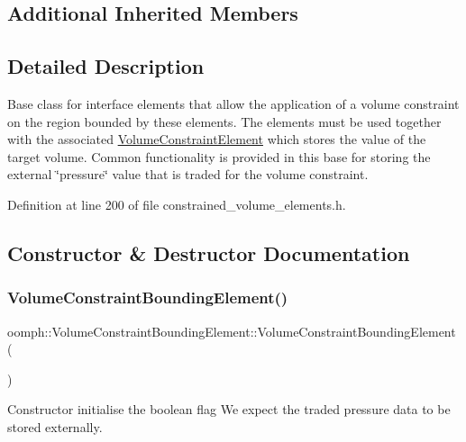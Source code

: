 \subsection*{Additional Inherited Members}


\subsection{Detailed Description}
Base class for interface elements that allow the application of a volume constraint on the region bounded by these elements. The elements must be used together with the associated \hyperlink{classoomph_1_1VolumeConstraintElement}{Volume\+Constraint\+Element} which stores the value of the target volume. Common functionality is provided in this base for storing the external \char`\"{}pressure\char`\"{} value that is traded for the volume constraint. 

Definition at line 200 of file constrained\+\_\+volume\+\_\+elements.\+h.



\subsection{Constructor \& Destructor Documentation}
\mbox{\label{classoomph_1_1VolumeConstraintBoundingElement_a423139995a5543fda59d36cf230edb44}} 
\subsubsection{\texorpdfstring{Volume\+Constraint\+Bounding\+Element()}{VolumeConstraintBoundingElement()}}
{\footnotesize\ttfamily oomph\+::\+Volume\+Constraint\+Bounding\+Element\+::\+Volume\+Constraint\+Bounding\+Element (\begin{DoxyParamCaption}{ }\end{DoxyParamCaption})\hspace{0.3cm}{\ttfamily [inline]}}



Constructor initialise the boolean flag We expect the traded pressure data to be stored externally. 



